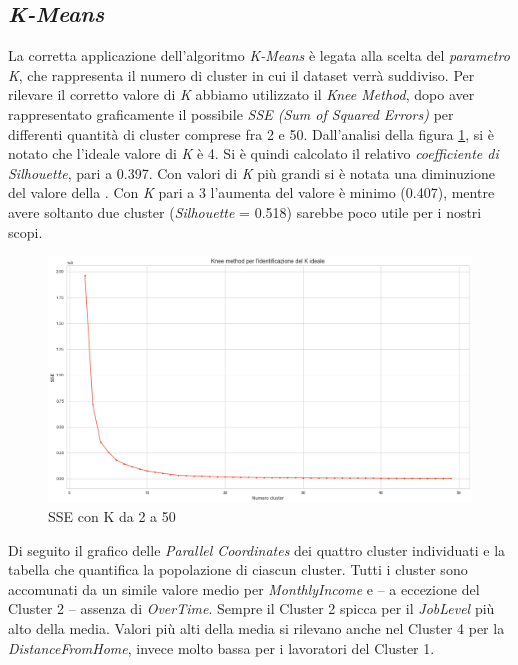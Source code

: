 \subsection{\textit{K-Means}}
La corretta applicazione dell’algoritmo \textit{K-Means} è legata alla scelta del \textit{parametro K}, che rappresenta il numero di cluster in cui il dataset verrà suddiviso. Per rilevare il corretto valore di\textit{ K} abbiamo utilizzato il \textit{Knee Method}, dopo aver rappresentato graficamente il possibile \textit{SSE (Sum of Squared Errors)} per differenti quantità di cluster comprese fra 2 e 50. Dall’analisi della figura \ref{fig:SSE}, si è notato che l’ideale valore di \textit{K} è 4. Si è quindi calcolato il relativo \textit{coefficiente di Silhouette}, pari a 0.397. Con valori di \textit{K} più grandi si è notata una diminuzione del valore della . Con \textit{K} pari a 3 l’aumenta del valore è minimo (0.407), mentre avere soltanto due cluster (\textit{Silhouette} = 0.518) sarebbe poco utile per i nostri scopi.
\begin{figure}[H]
    \centering
    \includegraphics[scale=0.25]{Immagini/SSE.png}
    \caption{SSE con K da 2 a 50}
    \label{fig:SSE}
\end{figure}
\noindent Di seguito il grafico delle \textit{Parallel Coordinates} dei quattro cluster individuati e la tabella che quantifica la popolazione di ciascun cluster. Tutti i cluster sono accomunati da un simile valore medio per \textit{MonthlyIncome} e – a eccezione del Cluster 2 – assenza di \textit{OverTime}. Sempre il Cluster 2 spicca per il \textit{JobLevel} più alto della media. Valori più alti della media si rilevano anche nel Cluster 4 per la \textit{DistanceFromHome}, invece molto bassa per i lavoratori del Cluster 1. 
